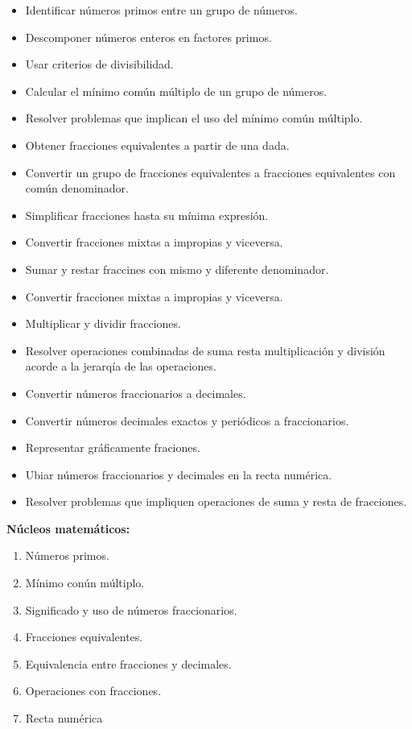 \documentclass[11pt]{article}
\begin{document}
\begin{itemize}
\setlength\itemsep{-0.4em}
    \item Identificar n\'umeros primos entre un grupo de n\'umeros.
    \item Descomponer n\'umeros enteros en factores primos.
    \item Usar criterios de divisibilidad.
    \item Calcular el m\'inimo com\'un m\'ultiplo de un grupo de n\'umeros.
    \item Resolver problemas que implican el uso del m\'inimo com\'un m\'ultiplo.
    \item Obtener fracciones equivalentes a partir de una dada.
    \item Convertir un grupo de fracciones equivalentes a fracciones
    equivalentes con com\'un denominador.
    \item Simplificar fracciones hasta su m\'inima expresi\'on.
    \item Convertir fracciones mixtas a impropias y viceversa.
    \item Sumar y restar fraccines con mismo y diferente denominador.
    \item Convertir fracciones mixtas a impropias y viceversa.
    \item Multiplicar y dividir fracciones.
    \item Resolver operaciones combinadas de suma resta multiplicaci\'on y
    divisi\'on acorde a la jerarq\'ia de las operaciones.
    \item Convertir n\'umeros fraccionarios a decimales.
    \item Convertir n\'umeros decimales exactos y peri\'odicos a fraccionarios.
    \item Representar gr\'aficamente fraciones.
    \item Ubiar n\'umeros fraccionarios y decimales en la recta num\'erica.
    \item Resolver problemas que impliquen operaciones de suma y resta de fracciones.
\end{itemize}

\textbf{N\'ucleos matem\'aticos:}

\begin{enumerate}
\setlength\itemsep{-0.4em}
    \item N\'umeros primos.
    \item M\'inimo con\'un m\'ultiplo.
    \item Significado y uso de n\'umeros fraccionarios.
    \item Fracciones equivalentes.
    \item Equivalencia entre fracciones y decimales.
    \item Operaciones con fracciones.
    \item Recta num\'erica
\end{enumerate}
\end{document}

